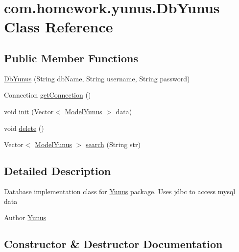 \hypertarget{classcom_1_1homework_1_1yunus_1_1_db_yunus}{}\section{com.\+homework.\+yunus.\+Db\+Yunus Class Reference}
\label{classcom_1_1homework_1_1yunus_1_1_db_yunus}
\subsection*{Public Member Functions}
\begin{DoxyCompactItemize}
\item 
\hyperlink{classcom_1_1homework_1_1yunus_1_1_db_yunus_a0471eb6b18272009f3bd3728510f4c6c}{Db\+Yunus} (String db\+Name, String username, String password)
\item 
Connection \hyperlink{classcom_1_1homework_1_1yunus_1_1_db_yunus_a5cdbf15a8027a2d8ff2201d451e12297}{get\+Connection} ()
\item 
void \hyperlink{classcom_1_1homework_1_1yunus_1_1_db_yunus_af545ad91b2ddf224346cb4914bd36583}{init} (Vector$<$ \hyperlink{classcom_1_1homework_1_1yunus_1_1_model_yunus}{Model\+Yunus} $>$ data)
\item 
void \hyperlink{classcom_1_1homework_1_1yunus_1_1_db_yunus_ac0f46ce9c1b762a530e4f19fae4e0f01}{delete} ()
\item 
Vector$<$ \hyperlink{classcom_1_1homework_1_1yunus_1_1_model_yunus}{Model\+Yunus} $>$ \hyperlink{classcom_1_1homework_1_1yunus_1_1_db_yunus_a3010b549e3a1b7b21d63c65f66d5a7eb}{search} (String str)
\end{DoxyCompactItemize}


\subsection{Detailed Description}
Database implementation class for \hyperlink{classcom_1_1homework_1_1yunus_1_1_yunus}{Yunus} package. Uses jdbc to access mysql data \begin{DoxyAuthor}{Author}
\hyperlink{classcom_1_1homework_1_1yunus_1_1_yunus}{Yunus} 
\end{DoxyAuthor}


\subsection{Constructor \& Destructor Documentation}
